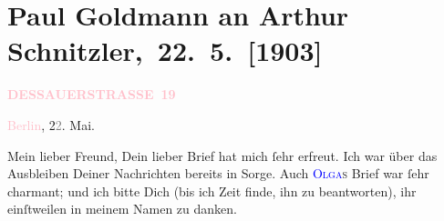 

\renewcommand{\erwaehntePersonen}{Personen: Otto Brahm, Julius Elias, Johannes Gaulke, Felix Paul Greve, Georg Hirschfeld, Paul Jonas, Elly Petersen, Theodore Rottenberg, Olga Schnitzler, Irene Triesch, Oscar Wilde}
\renewcommand{\erwaehnteInstitutionen}{Institutionen: Deutsches Theater Berlin, J. C. C. Bruns, Verlag Max Spohr}
\renewcommand{\erwaehnteOrte}{Orte: Berlin, Dessauer Straße, Italien, Leipzig, Minden, Schauspielhaus Leipzig, Südtirol, Wien}
\renewcommand{\erwaehnteWerke}{Werke: Berliner Theater. (»Lebendige Stunden« von Arthur Schnitzler.), Der Schleier der Beatrice. Schauspiel in fünf Akten, Dorian Gray, Dorian Grays Bildnis, Fink und Fliederbusch. Komödie in drei Akten, Lebendige Stunden. Vier Einakter, Professor Bernhardi. Komödie in fünf Akten, The picture of Dorian Gray}
\section[ Paul Goldmann an Arthur Schnitzler, 22. 5. {[}1903{]}]{Paul Goldmann an Arthur Schnitzler, 22. 5. {[}1903{]}}
\nopagebreak{}
\rehead{ }\normalsize\beginnumbering{}
\toendnotes[C]{\smallbreak\pagebreak[2]}
\toendnotes[C]{\smallbreak}
\pstart
           \noindent{}\raggedleft{}{\pb}\textcolor{gray}{\textbf{\textcolor{pink}{DESSAUERSTRASSE 19}{}\ledrightnote{\textcolor{pink}{Dessauer Straße}}}}\pend
           
\pstart
           \textcolor{pink}{Berlin}{}\ledrightnote{\textcolor{pink}{Berlin}}, 2\textcolor{gray}{2}. Mai.\pend
           
\pstart{}Mein lieber Freund,\pend
\pstart
           Dein lieber Brief hat mich ſehr erfreut. Ich war über das Ausbleiben Deiner
               Nachrichten bereits in Sorge. Auch \textsc{\textcolor{blue}{Olga}{}\ledrightnote{\textcolor{blue}{Olga Schnitzler}}s} Brief war ſehr charmant; und ich
               bitte Dich (bis ich Zeit finde, ihn zu beantworten), ihr einſtweilen in meinem Namen
               zu danken.\pend
           
